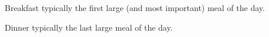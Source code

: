 
\begin{deflist}
    \raggedright
    \item[Breakfast] typically the first large (and most important) meal of the day.
    
    \item[Dinner] typically the last large meal of the day.
\end{deflist}
